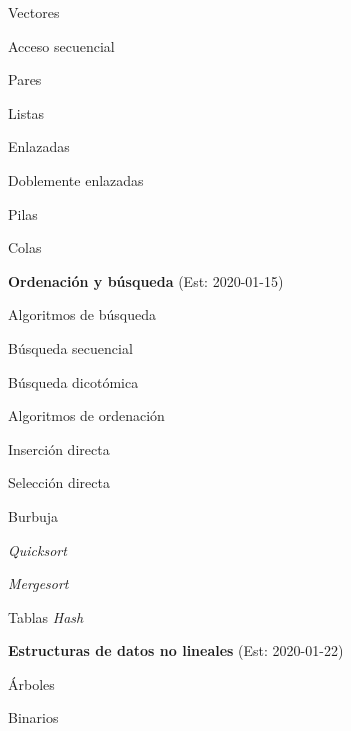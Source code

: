 \begin{longenum}
\begin{longenum}
\begin{longenum}
            \item Vectores
        \end{longenum}
        \item Acceso secuencial
        \begin{longenum}
            \item Pares
            \item Listas
            \begin{longenum}
                \item Enlazadas
                \item Doblemente enlazadas
            \end{longenum}
            \item Pilas
            \item Colas
        \end{longenum}
    \end{longenum}
    \item \textbf{Ordenación y búsqueda}  (Est: 2020-01-15)
    \begin{longenum}
        \item Algoritmos de búsqueda
        \begin{longenum}
            \item Búsqueda secuencial
            \item Búsqueda dicotómica
        \end{longenum}
        \item Algoritmos de ordenación
        \begin{longenum}
            \item Inserción directa
            \item Selección directa
            \item Burbuja
            \item \textit{Quicksort}
            \item \textit{Mergesort}
        \end{longenum}
        \item Tablas \textit{Hash}
    \end{longenum}
    \item \textbf{Estructuras de datos no lineales}  (Est: 2020-01-22)
    \begin{longenum}
        \item Árboles
        \begin{longenum}
            \item Binarios
            \begin{longenum}

\end{longenum}
\end{longenum}
\end{longenum}
\end{longenum}
